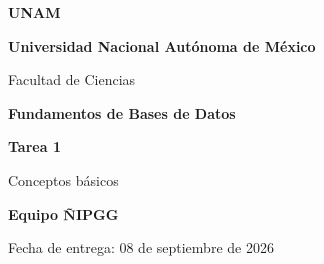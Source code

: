 
\begin{titlepage}
    \thispagestyle{empty}
    \centering

    \vspace*{0.8cm}
    \begin{tcolorbox}[colback=white,colframe=unamblue,width=.80\textwidth,
      arc=5mm,boxrule=1pt]
      \centering\vspace{0.25cm}
      {\fontsize{24}{28}\selectfont\color{unamblue}\textbf{UNAM}\par}
      \vspace{0.25cm}
    \end{tcolorbox}

    \vspace{1.1cm}
    {\fontsize{23}{27}\selectfont\color{unamblue}
      \textbf{Universidad Nacional Autónoma de México}\par}
    \vspace{0.45cm}
    {\fontsize{17}{21}\selectfont\color{unamblue}Facultad de Ciencias\par}

    \vspace{1.7cm}
    \begin{tcolorbox}[colback=lightgray,colframe=unamblue,width=.90\textwidth,
      sharp corners,boxrule=2pt]
      \centering\vspace{0.35cm}
      {\fontsize{19}{23}\selectfont\textbf{Fundamentos de Bases de Datos}\par}
      \vspace{0.6cm}
      {\fontsize{27}{31}\selectfont\color{unamblue}\textbf{Tarea 1}\par}
      \vspace{0.25cm}
      {\fontsize{18}{22}\selectfont Conceptos básicos\par}
      \vspace{0.35cm}
    \end{tcolorbox}

    \vspace{1cm}
    {\large \textbf{Equipo ÑIPGG}}\par
    {\normalsize Fecha de entrega: 08 de septiembre de 2026}\par

    \vfill


\end{titlepage}
